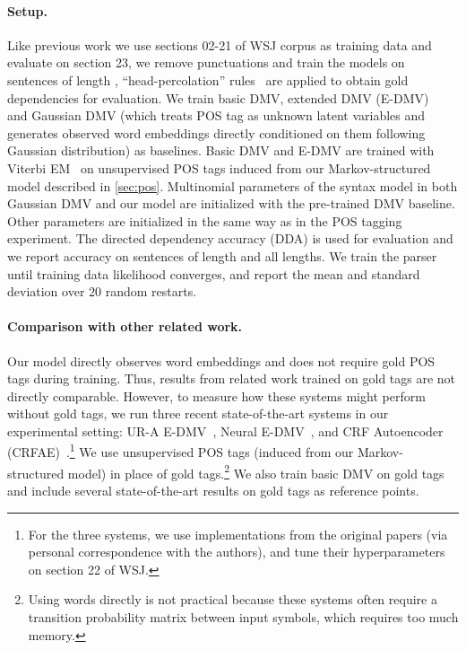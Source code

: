 \documentclass[11pt,a4paper]{article}
\begin{document}
\paragraph{Setup.}
Like previous work we use sections 02-21 of WSJ corpus as training data and evaluate on section 23,  we remove punctuations and train the models on sentences of length , ``head-percolation'' rules~\citep{collins1999head} are applied to obtain gold dependencies for evaluation. We train basic DMV, extended DMV (E-DMV)~\citep{headden2009improving} and Gaussian DMV (which treats POS tag as unknown latent variables and generates observed word embeddings directly conditioned on them following Gaussian distribution) as baselines. Basic DMV and E-DMV are trained with Viterbi EM~\citep{spitkovsky2010viterbi} on unsupervised POS tags induced from our Markov-structured model described in \cref{sec:pos}. Multinomial parameters of the syntax model in both Gaussian DMV and our model are initialized with the pre-trained DMV baseline. Other parameters are initialized in the same way as in the POS tagging experiment. The directed dependency accuracy (DDA) is used for evaluation and we report accuracy on sentences of length  and all lengths. We train the parser until training data likelihood converges, and report the mean and standard deviation over 20 random restarts. 

\paragraph{Comparison with other related work.}
Our model directly observes word embeddings and does not require gold POS tags during training. Thus, results from related work trained on gold tags are not directly comparable. However, to measure how these systems might perform without gold tags, we run three recent state-of-the-art systems in our experimental setting: UR-A E-DMV~\citep{tu2012unambiguity}, Neural E-DMV~\citep{jiang2016unsupervised}, and CRF Autoencoder (CRFAE)~\citep{cai2017crf}.\footnote{For the three systems, we use implementations from the original papers (via personal correspondence with the authors), and tune their hyperparameters on section 22 of WSJ.} We use unsupervised POS tags (induced from our Markov-structured model) in place of gold tags.\footnote{Using words directly is not practical because these systems often require a transition probability matrix between input symbols, which requires too much memory.} We also train basic DMV on gold tags and include several state-of-the-art results on gold tags as reference points.
\end{document}
